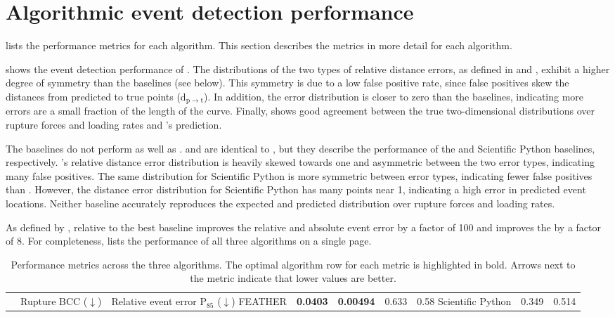 \section{Algorithmic event detection performance}

 lists the performance metrics for each algorithm. This section describes the metrics in more detail for each algorithm. 

 shows the event detection performance of \name{}. The distributions of the two types of relative distance errors, as defined in  and , exhibit a higher degree of symmetry than the baselines (see below). This symmetry is due to a low false positive rate, since false positives skew the distances from predicted to true points (d$_{\mathrm{p}\rightarrow\mathrm{t}}$). In addition, the error distribution is closer to zero than the baselines, indicating more errors are a small fraction of the length of the curve. Finally,  shows good agreement between the true two-dimensional distributions over rupture forces and loading rates and \name{}'s prediction.

The baselines do not perform as well as \name{}.  and  are identical to , but they describe the performance of the \OpenFovea{} and Scientific Python baselines, respectively. \OpenFovea{}'s relative distance error distribution is heavily skewed towards one and asymmetric between the two error types, indicating many false positives. The same distribution for Scientific Python is more symmetric between error types, indicating fewer false positives than \OpenFovea{}. However, the distance error distribution for Scientific Python has many points near 1, indicating a high error in predicted event locations. Neither baseline accurately reproduces the expected and predicted distribution over rupture forces and loading rates.

As defined by , relative to the best baseline \name{} improves the relative and absolute event error by a factor of 100 and improves the \BccLong{} by a factor of 8. For completeness,  lists the performance of all three algorithms on a single page.

\begin{table}
\caption[Algorithm performance]{ Performance metrics across the three algorithms. The optimal algorithm row for each metric is highlighted in bold. Arrows next to the metric indicate that lower values are better.}
\begin{tabularx}{\textwidth}{ l || l | l }
\hline \hline
 & Rupture BCC ($\downarrow$) & Relative event error P$_{85}$ ($\downarrow$)\e\hline 
FEATHER & \textbf{0.0403} & \textbf{0.00494}\e
\OpenFovea{} & 0.633 & 0.58\e
Scientific Python & 0.349 & 0.514\e
\end{tabularx}
\end{table}



